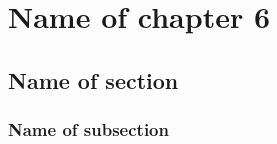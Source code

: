 

\graphicspath{{6/figures/}} %


\chapter{\label{ch6}Name of chapter 6} %

\section{\label{6:1}Name of section}

\subsection{\label{6:1:1}Name of subsection}




